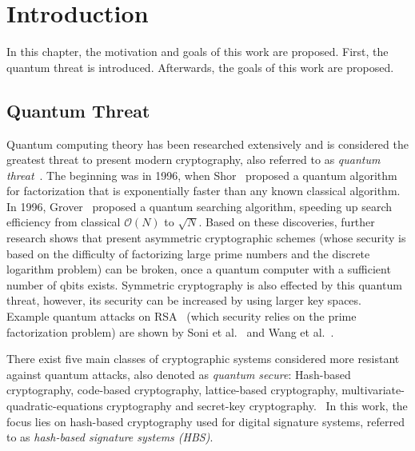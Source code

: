 \chapter{Introduction}
\label{cha:introduction}
In this chapter, the motivation and goals of this work are proposed. First, the quantum threat is introduced. Afterwards, the goals of this work are proposed.

\section{Quantum Threat}
Quantum computing theory has been researched extensively and is considered the greatest threat to present modern cryptography, also referred to as \textit{quantum threat}~\cite{impact_quantum_crypto_2018}.
The beginning was in 1996, when Shor~\cite{shors_algo_original_1999} proposed a quantum algorithm for factorization that is exponentially faster than any known classical algorithm. In 1996, Grover~\cite{grovers_algo_basispaper_1997} proposed a quantum searching algorithm, speeding up search efficiency from classical $\mathcal{O}(N)$ to $\sqrt{N}$. 
Based on these discoveries, further research shows that present asymmetric cryptographic schemes (whose security is based on the difficulty of factorizing large prime numbers and the discrete logarithm problem) can be broken, once a quantum computer with a sufficient number of qbits exists. 
Symmetric cryptography is also effected by this quantum threat, however, its security can be increased by using larger key spaces.~\cite{impact_quantum_crypto_2018} %
Example quantum attacks on RSA~\cite{rsa_patent} (which security relies on the prime factorization problem) are shown by Soni et al.~\cite{RSA_pq-attack_examples_2018} and Wang et al.~\cite{RSA_pq-attack_without_factorization_2018}. %

There exist five main classes of cryptographic systems considered more resistant against quantum attacks, also denoted as \textit{quantum secure}: Hash-based cryptography, code-based cryptography, lattice-based cryptography, multivariate-quadratic-equations cryptography and secret-key cryptography.~\cite{book_pqc_bernstein_2004}
In this work, the focus lies on hash-based cryptography used for digital signature systems, referred to as \textit{hash-based signature systems (HBS)}.

